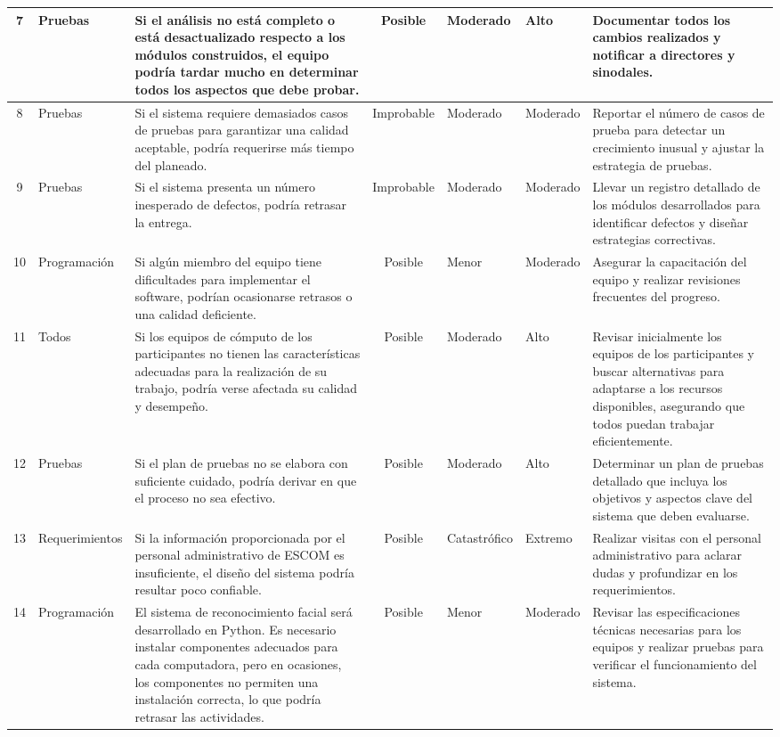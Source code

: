 \begin{longtable}{|c|p{2cm}|p{3cm}|c|p{2cm}|p{2cm}|p{3cm}|}
		7 & Pruebas & Si el análisis no está completo o está desactualizado respecto a los módulos construidos, el equipo podría tardar mucho en determinar todos los aspectos que debe probar. & Posible & Moderado & Alto & Documentar todos los cambios realizados y notificar a directores y sinodales. \\ \hline
		8 & Pruebas & Si el sistema requiere demasiados casos de pruebas para garantizar una calidad aceptable, podría requerirse más tiempo del planeado. & Improbable & Moderado & Moderado & Reportar el número de casos de prueba para detectar un crecimiento inusual y ajustar la estrategia de pruebas. \\ \hline
		9 & Pruebas & Si el sistema presenta un número inesperado de defectos, podría retrasar la entrega. & Improbable & Moderado & Moderado & Llevar un registro detallado de los módulos desarrollados para identificar defectos y diseñar estrategias correctivas. \\ \hline
		10 & Programación & Si algún miembro del equipo tiene dificultades para implementar el software, podrían ocasionarse retrasos o una calidad deficiente. & Posible & Menor & Moderado & Asegurar la capacitación del equipo y realizar revisiones frecuentes del progreso. \\ \hline
		11 & Todos & Si los equipos de cómputo de los participantes no tienen las características adecuadas para la realización de su trabajo, podría verse afectada su calidad y desempeño. & Posible & Moderado & Alto & Revisar inicialmente los equipos de los participantes y buscar alternativas para adaptarse a los recursos disponibles, asegurando que todos puedan trabajar eficientemente. \\ \hline
		12 & Pruebas & Si el plan de pruebas no se elabora con suficiente cuidado, podría derivar en que el proceso no sea efectivo. & Posible & Moderado & Alto & Determinar un plan de pruebas detallado que incluya los objetivos y aspectos clave del sistema que deben evaluarse. \\ \hline
		13 & Requerimientos & Si la información proporcionada por el personal administrativo de ESCOM es insuficiente, el diseño del sistema podría resultar poco confiable. & Posible & Catastrófico & Extremo & Realizar visitas con el personal administrativo para aclarar dudas y profundizar en los requerimientos. \\ \hline
		14 & Programación & El sistema de reconocimiento facial será desarrollado en Python. Es necesario instalar componentes adecuados para cada computadora, pero en ocasiones, los componentes no permiten una instalación correcta, lo que podría retrasar las actividades. & Posible & Menor & Moderado & Revisar las especificaciones técnicas necesarias para los equipos y realizar pruebas para verificar el funcionamiento del sistema. \\ \hline

\end{longtable}
